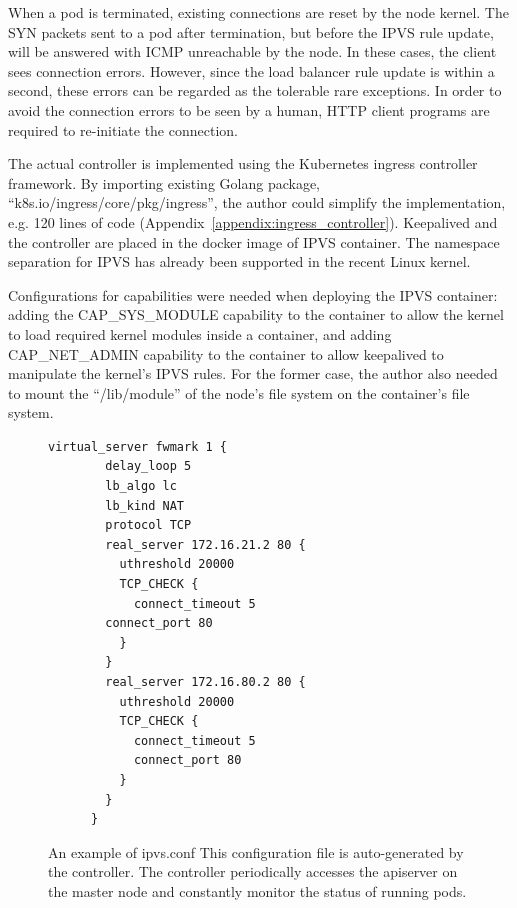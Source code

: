When a pod is terminated, existing connections are reset by the node kernel.
The SYN packets sent to a pod after termination, but before the IPVS rule update, will be answered with ICMP unreachable by the node.
In these cases, the client sees connection errors.
However, since the load balancer rule update is within a second, these errors can be regarded as the tolerable rare exceptions.
In order to avoid the connection errors to be seen by a human, HTTP client programs are required to re-initiate the connection.

The actual controller \cite{ktaka_ccmp_2017_826894} is implemented using the Kubernetes ingress controller \cite{K8sIngress2017} framework. 
By importing existing Golang package, \enquote{k8s.io/ingress/core/pkg/ingress}, the author could simplify the implementation, e.g. 
120 lines of code (Appendix~\ref{appendix:ingress_controller}).
%
Keepalived and the controller are placed in the docker image of IPVS container.
The namespace separation for IPVS has already been supported in the recent Linux kernel. 

Configurations for capabilities were needed when deploying the IPVS container: adding the CAP\_SYS\_MODULE capability 
to the container to allow the kernel to load required kernel modules inside a container, 
and adding CAP\_NET\_ADMIN capability to the container to allow keepalived to manipulate the kernel's IPVS rules. 
For the former case, the author also needed to mount the \enquote{/lib/module} of the node's file system on the container's file system.

\begin{figure}[h]
  \centering
  \begin{minipage}{0.6\columnwidth}
    \begin{lstlisting}[frame=lines,breaklines=true,basicstyle=\small\ttfamily]
      virtual_server fwmark 1 {
        delay_loop 5
        lb_algo lc
        lb_kind NAT
        protocol TCP
        real_server 172.16.21.2 80 {
          uthreshold 20000
          TCP_CHECK {
            connect_timeout 5
        connect_port 80
          }
        }
        real_server 172.16.80.2 80 {
          uthreshold 20000
          TCP_CHECK {
            connect_timeout 5
            connect_port 80
          }
        }
      }
    \end{lstlisting}
  \end{minipage}

  \par\bigskip
    \centering
    \begin{minipage}{0.9\columnwidth}
      \caption[An example of ipvs.conf]{
        An example of ipvs.conf
        This configuration file is auto-generated by the controller.
        The controller periodically accesses the apiserver on the master node and constantly monitor the status of running pods.
      }
      \label{fig:ipvs.conf}
    \end{minipage}
\end{figure}

